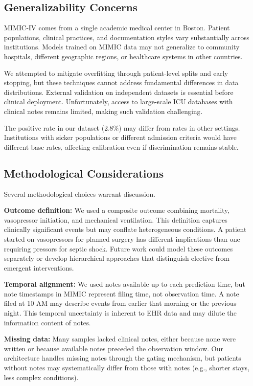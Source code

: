 \subsection{Generalizability Concerns}

MIMIC-IV comes from a single academic medical center in Boston. Patient populations, clinical practices, and documentation styles vary substantially across institutions. Models trained on MIMIC data may not generalize to community hospitals, different geographic regions, or healthcare systems in other countries.

We attempted to mitigate overfitting through patient-level splits and early stopping, but these techniques cannot address fundamental differences in data distributions. External validation on independent datasets is essential before clinical deployment. Unfortunately, access to large-scale ICU databases with clinical notes remains limited, making such validation challenging.

The positive rate in our dataset (2.8\%) may differ from rates in other settings. Institutions with sicker populations or different admission criteria would have different base rates, affecting calibration even if discrimination remains stable.

\subsection{Methodological Considerations}

Several methodological choices warrant discussion.

\textbf{Outcome definition:} We used a composite outcome combining mortality, vasopressor initiation, and mechanical ventilation. This definition captures clinically significant events but may conflate heterogeneous conditions. A patient started on vasopressors for planned surgery has different implications than one requiring pressors for septic shock. Future work could model these outcomes separately or develop hierarchical approaches that distinguish elective from emergent interventions.

\textbf{Temporal alignment:} We used notes available up to each prediction time, but note timestamps in MIMIC represent filing time, not observation time. A note filed at 10 AM may describe events from earlier that morning or the previous night. This temporal uncertainty is inherent to EHR data and may dilute the information content of notes.

\textbf{Missing data:} Many samples lacked clinical notes, either because none were written or because available notes preceded the observation window. Our architecture handles missing notes through the gating mechanism, but patients without notes may systematically differ from those with notes (e.g., shorter stays, less complex conditions).

